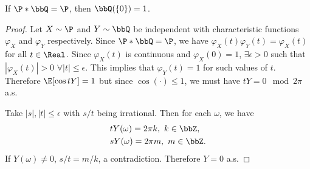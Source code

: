 \documentclass[../aipt.tex]{subfiles}
\begin{document}
\begin{Lemma}\label{wk11:lem:Q0}
If $\P*\bbQ=\P$, then $\bbQ(\{0\})=1$.
\end{Lemma}
\begin{proof}
Let $X\sim\P$ and $Y\sim\bbQ$ be independent with characteristic functions $\varphi_X$ and $\varphi_Y$ respectively. Since $\P*\bbQ=\P$, we have $\varphi_X(t)\varphi_Y(t)=\varphi_X(t)$ for all $t\in\Real$. Since $\varphi_X(t)$ is continuous and $\varphi_X(0)=1$, $\exists \epsilon>0$ such that $|\varphi_X(t)|>0$ $\forall |t| \leq \epsilon$. This implies that $\varphi_Y(t)=1$ for such values of $t$. Therefore $\E[\cos tY]=1$ but since $\cos(\cdot) \leq 1$, we must have $tY = 0 \mod 2\pi$ a.s. 

Take $|s|, |t|\leq \epsilon$ with $s/t$ being irrational. Then for each $\omega$, we have
\begin{align*}
& tY(\omega) = 2\pi k,\ k\in\bbZ,\\
& sY(\omega) = 2\pi m,\ m\in\bbZ.
\end{align*}
If $Y(\omega) \ne 0$, $s/t = m/k$, a contradiction. Therefore $Y=0$ a.s.
\end{proof}
\end{document}
